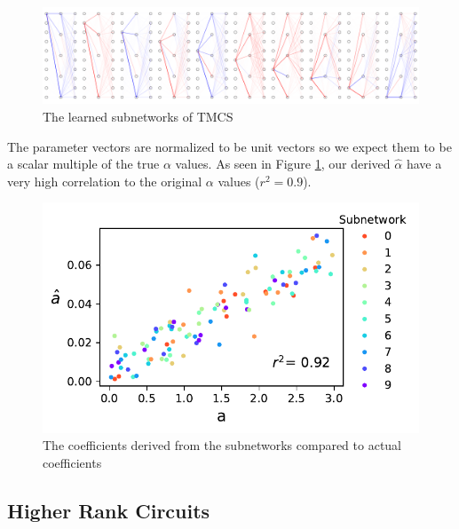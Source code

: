 \documentclass{article}
\theoremstyle{plain}
\theoremstyle{definition}
\theoremstyle{remark}
\begin{document}
\begin{figure}[htbp]
    \centerline{\includegraphics[width=\textwidth]{../figures/5_circuit_superposition_decomposition.pdf}}
    \centering
    \caption{The learned subnetworks of TMCS}\label{fig:5_circuit_superposition_decomposition}
\end{figure}

The parameter vectors are normalized to be unit vectors so we expect them to be a scalar multiple of the true $\alpha$ values. As seen in Figure \ref{fig:5_circuit_superposition_decomposition}, our derived $\hat{\alpha}$ have a very high correlation to the original $\alpha$ values ($r^2 = 0.9$).

\begin{figure}[htbp]
    \centerline{\includegraphics[width=\columnwidth]{../figures/6_circuit_superposition_coefficients.pdf}}
    \centering
    \caption{The coefficients derived from the subnetworks compared to actual coefficients}\label{fig:6_circuit_superposition_coefficients}
\end{figure}



\subsection{Higher Rank Circuits}
\end{document}
